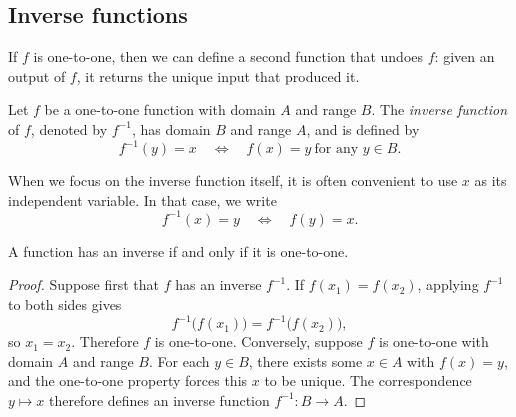 \subsection{Inverse functions}

If \(f\) is one-to-one, then we can define a second function that undoes \(f\): given an output of \(f\), it returns the unique input that produced it.

\begin{definition}
Let \(f\) be a one-to-one function with domain \(A\) and range \(B\). The \emph{inverse function} of \(f\), denoted by \(f^{-1}\), has domain \(B\) and range \(A\), and is defined by
\[
f^{-1}(y) = x \quad \Longleftrightarrow \quad f(x) = y \ \text{for any } y \in B.
\]
\end{definition}

\begin{remark}
When we focus on the inverse function itself, it is often convenient to use \(x\) as its independent variable. In that case, we write
\[
f^{-1}(x) = y \quad \Longleftrightarrow \quad f(y) = x.
\]
\end{remark}

\begin{theorem}
A function has an inverse if and only if it is one-to-one.
\end{theorem}

\begin{proof}
Suppose first that \(f\) has an inverse \(f^{-1}\). If \(f(x_{1}) = f(x_{2})\), applying \(f^{-1}\) to both sides gives
\[
f^{-1}\!\bigl(f(x_{1})\bigr) = f^{-1}\!\bigl(f(x_{2})\bigr),
\]
so \(x_{1} = x_{2}\). Therefore \(f\) is one-to-one. Conversely, suppose \(f\) is one-to-one with domain \(A\) and range \(B\). For each \(y \in B\), there exists some \(x \in A\) with \(f(x) = y\), and the one-to-one property forces this \(x\) to be unique. The correspondence \(y \mapsto x\) therefore defines an inverse function \(f^{-1} : B \to A\).
\end{proof}

